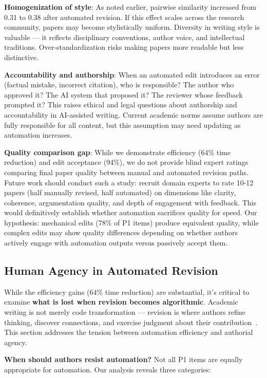 \textbf{Homogenization of style}: As noted earlier, pairwise similarity increased from 0.31 to 0.38 after automated revision. If this effect scales across the research community, papers may become stylistically uniform. Diversity in writing style is valuable — it reflects disciplinary conventions, author voice, and intellectual traditions. Over-standardization risks making papers more readable but less distinctive.

\textbf{Accountability and authorship}: When an automated edit introduces an error (factual mistake, incorrect citation), who is responsible? The author who approved it? The AI system that proposed it? The reviewer whose feedback prompted it? This raises ethical and legal questions about authorship and accountability in AI-assisted writing. Current academic norms assume authors are fully responsible for all content, but this assumption may need updating as automation increases.

\textbf{Quality comparison gap}: While we demonstrate efficiency (64\% time reduction) and edit acceptance (94\%), we do not provide blind expert ratings comparing final paper quality between manual and automated revision paths. Future work should conduct such a study: recruit domain experts to rate 10-12 papers (half manually revised, half automated) on dimensions like clarity, coherence, argumentation quality, and depth of engagement with feedback. This would definitively establish whether automation sacrifices quality for speed. Our hypothesis: mechanical edits (78\% of P1 items) produce equivalent quality, while complex edits may show quality differences depending on whether authors actively engage with automation outputs versus passively accept them.

\subsection{Human Agency in Automated Revision}

While the efficiency gains (64\% time reduction) are substantial, it's critical to examine \textbf{what is lost when revision becomes algorithmic}. Academic writing is not merely code transformation — revision is where authors refine thinking, discover connections, and exercise judgment about their contribution~\cite{flower1981cognitive,hayes1996new}. This section addresses the tension between automation efficiency and authorial agency.

\textbf{When should authors resist automation?} Not all P1 items are equally appropriate for automation. Our analysis reveals three categories:

